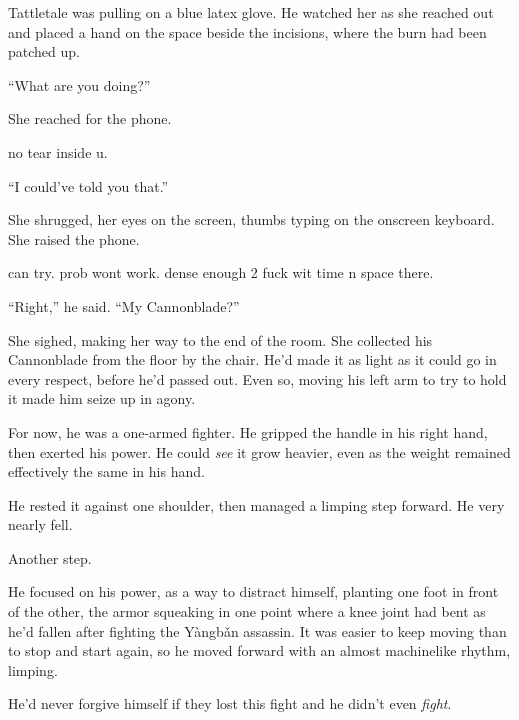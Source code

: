 Tattletale was pulling on a blue latex glove.  He watched her as she reached out and placed a hand on the space beside the incisions, where the burn had been patched up.



``What are you doing?''



She reached for the phone.



no tear inside u.



``I could've told you that.''



She shrugged, her eyes on the screen, thumbs typing on the onscreen keyboard.  She raised the phone.



can try.  prob wont work.  dense enough 2 fuck wit time n space there.



``Right,'' he said.  ``My Cannonblade?''



She sighed, making her way to the end of the room.  She collected his Cannonblade from the floor by the chair.  He'd made it as light as it could go in every respect, before he'd passed out.  Even so, moving his left arm to try to hold it made him seize up in agony.



For now, he was a one-armed fighter.  He gripped the handle in his right hand, then exerted his power.  He could \emph{see} it grow heavier, even as the weight remained effectively the same in his hand.



He rested it against one shoulder, then managed a limping step forward.  He very nearly fell.



Another step.



He focused on his power, as a way to distract himself, planting one foot in front of the other, the armor squeaking in one point where a knee joint had bent as he'd fallen after fighting the Y\`{a}ngb\v{a}n assassin.  It was easier to keep moving than to stop and start again, so he moved forward with an almost machinelike rhythm, limping.



He'd never forgive himself if they lost this fight and he didn't even \emph{fight}.



